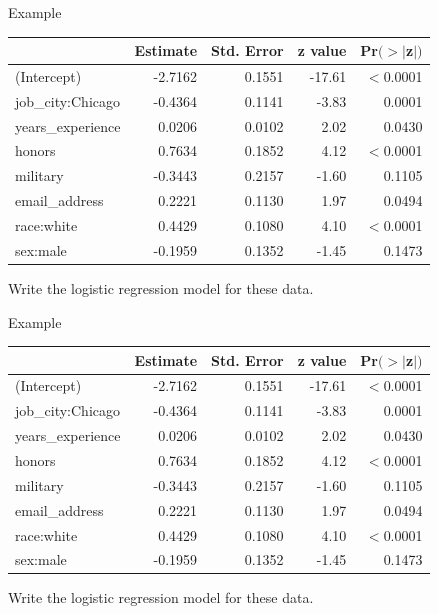 \begin{frame}{Example}
        \begin{table}[h]
        \centering
        \begin{tabular}{l rrrr}
            \hline
                    & Estimate & Std. Error & z value & Pr$(>|$z$|)$ \\
            \hline
(Intercept)         & -2.7162 & 0.1551 & -17.61 & $<$0.0001 \\
job\_city:Chicago   & -0.4364 & 0.1141 & -3.83 & 0.0001 \\
years\_experience   & 0.0206 & 0.0102 & 2.02 & 0.0430 \\
honors              & 0.7634 & 0.1852 & 4.12 & $<$0.0001 \\
military            & -0.3443 & 0.2157 & -1.60 & 0.1105 \\
email\_address      & 0.2221 & 0.1130 & 1.97 & 0.0494 \\
race:white          & 0.4429 & 0.1080 & 4.10 & $<$0.0001 \\
sex:male            & -0.1959 & 0.1352 & -1.45 & 0.1473 \\
            \hline
        \end{tabular}
    \end{table}
    Write the logistic regression model for these data.
\end{frame}

\begin{frame}{Example}
        \begin{table}[h]
        \centering
        \begin{tabular}{l rrrr}
            \hline
                    & Estimate & Std. Error & z value & Pr$(>|$z$|)$ \\
            \hline
(Intercept)         & -2.7162 & 0.1551 & -17.61 & $<$0.0001 \\
job\_city:Chicago   & -0.4364 & 0.1141 & -3.83 & 0.0001 \\
years\_experience   & 0.0206 & 0.0102 & 2.02 & 0.0430 \\
honors              & 0.7634 & 0.1852 & 4.12 & $<$0.0001 \\
military            & -0.3443 & 0.2157 & -1.60 & 0.1105 \\
email\_address      & 0.2221 & 0.1130 & 1.97 & 0.0494 \\
race:white          & 0.4429 & 0.1080 & 4.10 & $<$0.0001 \\
sex:male            & -0.1959 & 0.1352 & -1.45 & 0.1473 \\
            \hline
        \end{tabular}
    \end{table}
    Write the logistic regression model for these data.
\end{frame}

